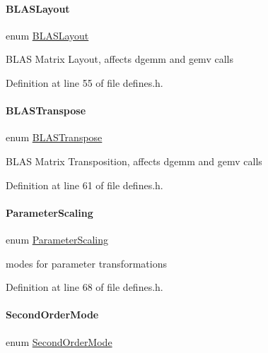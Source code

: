 \paragraph{\texorpdfstring{BLASLayout}{BLASLayout}}
{\footnotesize\ttfamily enum \mbox{\hyperlink{namespaceamici_a3ec6460bb4e7f6100a15d18627a3ff3e}{B\+L\+A\+S\+Layout}}\hspace{0.3cm}{\ttfamily [strong]}}

B\+L\+AS Matrix Layout, affects dgemm and gemv calls 

Definition at line 55 of file defines.\+h.

\mbox{\label{namespaceamici_a0f0ec77c6c8f48d9c5cb50d54899afae}} 
\paragraph{\texorpdfstring{BLASTranspose}{BLASTranspose}}
{\footnotesize\ttfamily enum \mbox{\hyperlink{namespaceamici_a0f0ec77c6c8f48d9c5cb50d54899afae}{B\+L\+A\+S\+Transpose}}\hspace{0.3cm}{\ttfamily [strong]}}

B\+L\+AS Matrix Transposition, affects dgemm and gemv calls 

Definition at line 61 of file defines.\+h.

\mbox{\label{namespaceamici_a42f062082226e9284c201d9eab71a3a0}} 
\paragraph{\texorpdfstring{ParameterScaling}{ParameterScaling}}
{\footnotesize\ttfamily enum \mbox{\hyperlink{namespaceamici_a42f062082226e9284c201d9eab71a3a0}{Parameter\+Scaling}}\hspace{0.3cm}{\ttfamily [strong]}}

modes for parameter transformations 

Definition at line 68 of file defines.\+h.

\mbox{\label{namespaceamici_a2d77779286167d5603a870bf9f6c21ba}} 
\paragraph{\texorpdfstring{SecondOrderMode}{SecondOrderMode}}
{\footnotesize\ttfamily enum \mbox{\hyperlink{namespaceamici_a2d77779286167d5603a870bf9f6c21ba}{Second\+Order\+Mode}}\hspace{0.3cm}{\ttfamily [strong]}}

